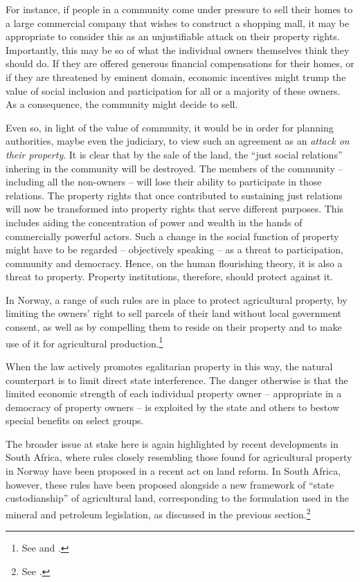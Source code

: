 For instance, if people in a community come under pressure to sell their homes to a large commercial company that wishes to construct a shopping mall, it may be appropriate to consider this as an unjustifiable attack on their property rights. Importantly, this may be so  of what the individual owners themselves think they should do. If they are offered generous financial compensations for their homes, or if they are threatened by eminent domain, economic incentives might trump the value of social inclusion and participation for all or a majority of these owners. As a consequence, the community might decide to sell.  

Even so, in light of the value of community, it would be in order for planning authorities, maybe even the judiciary, to view such an agreement as an {\it attack on their property}. It is clear that by the sale of the land, the ``just social relations'' inhering in the community will be destroyed. The members of the community -- including all the non-owners -- will lose their ability to participate in those relations. The property rights that once contributed to sustaining just relations will now be transformed into property rights that serve different purposes. This includes aiding the concentration of power and wealth in the hands of commercially powerful actors. Such a change in the social function of property might have to be regarded -- objectively speaking -- as a threat to participation, community and democracy. Hence, on the human flourishing theory, it is also a threat to property. Property institutions, therefore, should protect against it.

In Norway, a range of such rules are in place to protect agricultural property, by limiting the owners' right to sell parcels of their land without local government consent, as well as by compelling them to reside on their property and to make use of it for agricultural production.\footnote{See \cite[8|12]{la95} and \cite[4|5]{lca03}.} 

When the law actively promotes egalitarian property in this way, the natural counterpart is to limit direct state interference. The danger otherwise is that the limited economic strength of each individual property owner -- appropriate in a democracy of property owners -- is exploited by the state and others to bestow special benefits on select groups.

The broader issue at stake here is again highlighted by recent developments in South Africa, where  rules closely resembling those found for agricultural property in Norway have been proposed in a recent act on land reform. In South Africa, however, these rules have been proposed alongside a new framework of ``state custodianship'' of agricultural land, corresponding to the formulation used in the mineral and petroleum legislation, as discussed in the previous section.\footnote{See \cite{steyn15}.}


